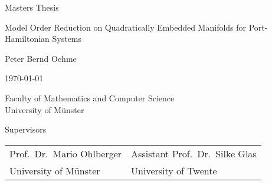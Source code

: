 \documentclass{article}
\begin{document}
    \begin{titlepage}
        \setlength{\parindent}{0pt}

        \begin{center}
            \vspace*{12em}

            Masters Thesis

            \vspace*{3em}

            {\Huge{Model Order Reduction on Quadratically Embedded Manifolds for Port-Hamiltonian Systems}\par}

            \vspace*{6em}

            {\Large{Peter Bernd Oehme}}

            \vspace*{\fill}

            \today

            \vspace*{3em}

            Faculty of Mathematics and Computer Science \\
            University of Münster

            \vspace*{3em}


            \vspace*{3em}

            Supervisors

            \begin{tabularx}{\textwidth}{YY}
                Prof.\ Dr.\ Mario Ohlberger & Assistant Prof.\ Dr.\ Silke Glas \\
                University of Münster & University of Twente
            \end{tabularx}
        \end{center}
    \end{titlepage}
\end{document}
